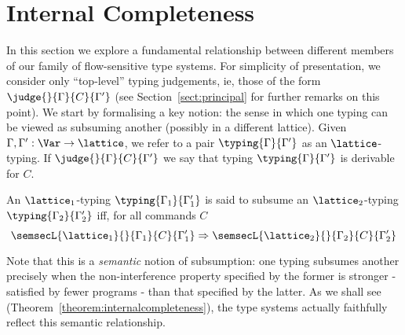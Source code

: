 \documentclass{sigplanconf}
\begin{document}
\section{Internal Completeness}\label{sect:completeness}
In this section we explore a fundamental relationship between different members of our
family of flow-sensitive type systems.
For simplicity of presentation, we consider only ``top-level'' typing judgements, ie, those
of the form $\judge{}{\Gamma}{C}{\Gamma'}$ (see Section~\ref{sect:principal} for further remarks
on this point).
We start by formalising a key notion: the sense in which one typing
can be viewed as subsuming another
(possibly in a different lattice).
Given $\Gamma, \Gamma' : \Var \rightarrow \lattice$,
we refer to a pair $\typing{\Gamma}{\Gamma'}$ as an $\lattice$-typing.
If $\judge{}{\Gamma}{C}{\Gamma'}$ we say that typing $\typing{\Gamma}{\Gamma'}$ is derivable for $C$.
\begin{definition}
    An $\lattice_1$-typing $\typing{\Gamma_1}{\Gamma'_1}$ is said to subsume
    an $\lattice_2$-typing $\typing{\Gamma_2}{\Gamma'_2}$ iff, for all commands $C$
    \[
        \semsecL{\lattice_1}{}{\Gamma_1}{C}{\Gamma'_1} => \semsecL{\lattice_2}{}{\Gamma_2}{C}{\Gamma'_2}
    \]
\end{definition}
Note that this is a \emph{semantic} notion of subsumption: one typing subsumes another
precisely when the non-interference property specified by the former is stronger - satisfied
by fewer programs - than that specified by the latter.
As we shall see (Theorem~\ref{theorem:internalcompleteness}),
the type systems actually faithfully reflect this semantic relationship.
\end{document}
